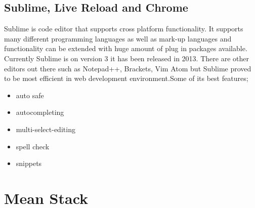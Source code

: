\begin{itemize}
\begin{itemize}
\end{itemize}


\subsection{Sublime, Live Reload and Chrome}
\bigbreak
Sublime is code editor that supports cross platform functionality. It supports many different programming languages as well as mark-up languages and functionality can be extended with huge amount of plug in packages available. Currently Sublime is on version 3 it has been released in 2013.
There are other editors out there such as Notepad++, Brackets, Vim Atom but Sublime proved to be most efficient in web development environment.Some of its best features;

\begin{itemize}
	
	\item auto safe 
	\item autocompleting 
	\item multi-select-editing 
	\item spell check 
	\item snippets  

\end{itemize}





\section{Mean Stack}

\end{itemize}
